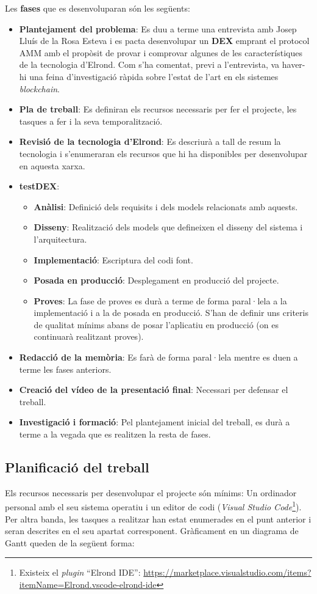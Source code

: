 \documentclass[11pt,a4paper]{article}
\begin{document}
Les \textbf{fases} que es desenvoluparan són les següents:
\begin{itemize}
    \item \textbf{Plantejament del problema}: Es duu a terme una entrevista amb Josep Lluís de la Rosa Esteva i es pacta desenvolupar un \textbf{DEX} emprant el protocol AMM amb el propòsit de provar i comprovar algunes de les característiques de la tecnologia d'Elrond. Com s'ha comentat, previ a l'entrevista, va haver-hi una feina d'investigació ràpida sobre l'estat de l'art en els sistemes \textit{blockchain}.
    \item \textbf{Pla de treball}: Es definiran els recursos necessaris per fer el projecte, les tasques a fer i la seva temporalització.
    \item \textbf{Revisió de la tecnologia d'Elrond}: Es descriurà a tall de resum la tecnologia i s'enumeraran els recursos que hi ha disponibles per desenvolupar en aquesta xarxa.
    \item \textbf{testDEX}:
    \begin{itemize}
    	\item \textbf{Anàlisi}: Definició dels requisits i dels models relacionats amb aquests. 
    	\item \textbf{Disseny}: Realització dels models que defineixen el disseny del sistema i l'arquitectura.
    	\item \textbf{Implementació}: Escriptura del codi font.
    	\item \textbf{Posada en producció}: Desplegament en producció del projecte.
    	\item \textbf{Proves}: La fase de proves es durà a terme de forma paral·lela a la implementació i a la de posada en producció. S'han de definir uns criteris de qualitat mínims abans de posar l'aplicatiu en producció (on es continuarà realitzant proves).
    \end{itemize}
    \item \textbf{Redacció de la memòria}: Es farà de forma paral·lela mentre es duen a terme les fases anteriors.
    \item \textbf{Creació del vídeo de la presentació final}: Necessari per defensar el treball.
    \item \textbf{Investigació i formació}: Pel plantejament inicial del treball, es durà a terme a la vegada que es realitzen la resta de fases.
\end{itemize}

\subsection{Planificació del treball}
Els recursos necessaris per desenvolupar el projecte són mínims: Un ordinador personal amb el seu sistema operatiu i un editor de codi (\textit{Visual Studio Code}\footnote{Existeix el \textit{plugin} ``Elrond IDE'': \url{https://marketplace.visualstudio.com/items?itemName=Elrond.vscode-elrond-ide}}). Per altra banda, les tasques a realitzar han estat enumerades en el punt anterior i seran descrites en el seu apartat corresponent. Gràficament en un diagrama de Gantt queden de la següent forma:
\end{document}
